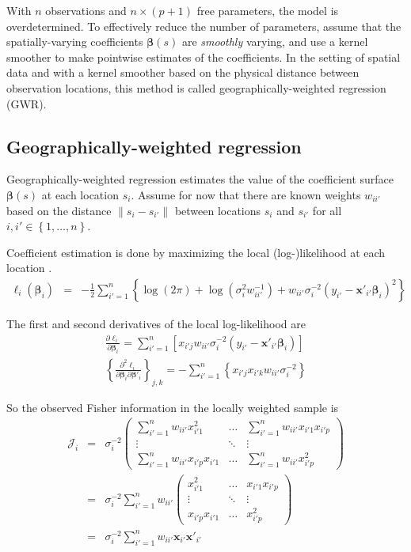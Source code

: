 \documentclass[authoryear, review, 11pt]{elsarticle}
\begin{document}
	With $n$ observations and $n \times (p+1)$ free parameters, the model is overdetermined. To effectively reduce the number of parameters, assume that the spatially-varying coefficients $\bm{\beta}(s)$ are \emph{smoothly} varying, and use a kernel smoother to make pointwise estimates of the coefficients. In the setting of spatial data and with a kernel smoother based on the physical distance between observation locations, this method is called geographically-weighted regression (GWR).
		
	\subsection{Geographically-weighted regression}
	Geographically-weighted regression estimates the value of the coefficient surface $\bm{\beta}(s)$ at each location $s_i$. Assume for now that there are known weights $w_{ii'}$ based on the distance $\|s_i  -s_{i'}\|$ between locations $s_i$ and $s_{i'}$ for all $i, i' \in \left\{1, \dots, n\right\}$.
	
	Coefficient estimation is done by maximizing the local (log-)likelihood at each location \citep{Fotheringham:2002}.	
	\begin{eqnarray}
		\ell_i\left(\bm{\beta}_i\right) &=& - \frac{1}{2} \sum_{i'=1}^n \left\{ \log{\left(2 \pi\right)}  + \log{\left(\sigma^2_i w^{-1}_{ii'} \right)}  +  w_{ii'} \sigma^{-2}_i  \left(y_{i'} - \bm{x}'_{i'} \bm{\beta}_i \right)^2 \right\}
	\end{eqnarray}
	
	The first and second derivatives of the local log-likelihood are
	\begin{eqnarray}
		\frac{\partial \ell_i}{\partial \bm{\beta}_i} =   \sum_{i'=1}^n \left[ x_{i'j} w_{ii'} \sigma^{-2}_i \left( y_{i'} - \bm{x}'_{i'} \bm{\beta}_i \right) \right] \\
		\left\{\frac{\partial^2 \ell_i}{\partial \bm{\beta}_i \partial \bm{\beta}'_i} \right\}_{j,k} = -\sum_{i'=1}^n \left\{ x_{i'j} x_{i'k} w_{ii'} \sigma^{-2}_i \right\}
	\end{eqnarray}
	
	So the observed Fisher information in the locally weighted sample is
	\begin{eqnarray}
		\bm{\mathcal{J}}_i &=& \sigma^{-2}_i \left( \begin{array}{ccc} \sum_{i'=1}^n  w_{ii'} x^2_{i'1}   & \dots & \sum_{i'=1}^n w_{ii'} x_{i'1} x_{i'p}   \\ \vdots & \ddots & \vdots \\ \sum_{i'=1}^n  w_{ii'} x_{i'p} x_{i'1}    & \dots & \sum_{i'=1}^n  w_{ii'} x^2_{i'p}  \end{array} \right) \\
		&=& \sigma^{-2}_i \sum_{i'=1}^n w_{ii'}\left( \begin{array}{ccc}  x^2_{i'1} & \dots & x_{i'1} x_{i'p} \\ \vdots & \ddots & \vdots \\ x_{i'p} x_{i'1} & \dots &  x^2_{i'p} \end{array} \right) \\
		&=& \sigma^{-2}_i \sum_{i'=1}^n w_{ii'} \bm{x}_{i'} \bm{x}'_{i'}
	\end{eqnarray}	
	
\end{document}
